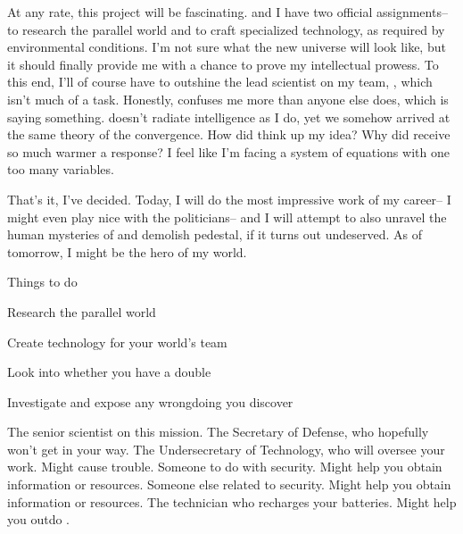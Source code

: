 \documentclass[char]{guildcamp3}
\begin{document}
At any rate, this project will be fascinating. \cSciOne and I have two official assignments-- to research the parallel world and to craft specialized technology, as required by environmental conditions. I'm not sure what the new universe will look like, but it should finally provide me with a chance to prove my intellectual prowess. To this end, I'll of course have to outshine the lead scientist on my team, \cSciOne, which isn't much of a task. Honestly, \cSciOne confuses me more than anyone else does, which is saying something. \cSciOne{\They} doesn't radiate intelligence as I do, yet we somehow arrived at the same theory of the convergence. How did \cSciOne{\they} think up my idea? Why did \cSciOne{\they} receive so much warmer a response? I feel like I'm facing a system of equations with one too many variables.

That's it, I've decided. Today, I will do the most impressive work of my career-- I might even play nice with the politicians-- and I will attempt to also unravel the human mysteries of \cSciOne and demolish \cSciOne{\their} pedestal, if it turns out undeserved. As of tomorrow, I might be the hero of my world.

\begin{itemz}[Goals]
  \item Things to do
  \item Research the parallel world
  \item Create technology for your world's team
  \item Look into whether you have a double
  \item Investigate \cSciOne and expose any wrongdoing you discover
\end{itemz}


\begin{contacts}
  \contact{\cSciOne{}} The senior scientist on this mission.
  \contact{\cPoliticianOne{}} The Secretary of Defense, who hopefully won't get in your way.
  \contact{\cPoliticianTwo{}} The Undersecretary of Technology, who will oversee your work. Might cause trouble.
  \contact{\cSpecOpsOne{}} Someone to do with security. Might help you obtain information or resources.
  \contact{\cSpecOpsOne{}} Someone else related to security. Might help you obtain information or resources.
  \contact{\cTechnician{}} The technician who recharges your batteries. Might help you outdo \cSciOne.
\end{contacts}


\end{document}
